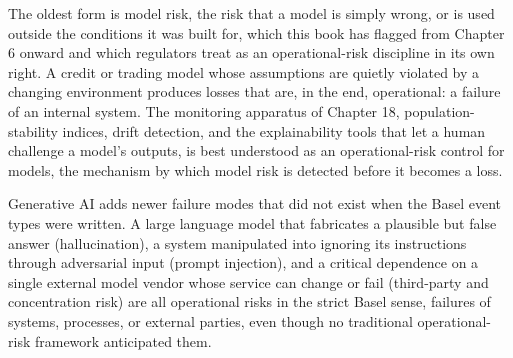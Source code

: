 \documentclass[../ai_in_finance]{subfiles}
\begin{document}
The oldest form is model risk, the risk that a model is simply wrong, or is used outside the conditions it was built for, which this book has flagged from Chapter 6 onward and which regulators treat as an operational-risk discipline in its own right. A credit or trading model whose assumptions are quietly violated by a changing environment produces losses that are, in the end, operational: a failure of an internal system. The monitoring apparatus of Chapter 18, population-stability indices, drift detection, and the explainability tools that let a human challenge a model's outputs, is best understood as an operational-risk control for models, the mechanism by which model risk is detected before it becomes a loss.

Generative AI adds newer failure modes that did not exist when the Basel event types were written. A large language model that fabricates a plausible but false answer (hallucination), a system manipulated into ignoring its instructions through adversarial input (prompt injection), and a critical dependence on a single external model vendor whose service can change or fail (third-party and concentration risk) are all operational risks in the strict Basel sense, failures of systems, processes, or external parties, even though no traditional operational-risk framework anticipated them.
\end{document}

